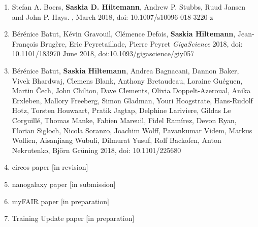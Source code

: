 \begin{enumerate}
\item Stefan A. Boers, \textbf{Saskia D. Hiltemann}, Andrew P. Stubbs, Ruud Jansen and John P. Hays. {\color{chaptergrey}{Development and evaluation of a culture-free microbiota profiling platform (MYcrobiota) for clinical diagnostics}}, March 2018, doi: 10.1007/s10096-018-3220-z

\item Bérénice Batut, Kévin Gravouil, Clémence Defois, \textbf{Saskia Hiltemann}, Jean-François Brugère, Eric Peyretaillade, Pierre Peyret {\color{chaptergrey}{ASaiM: a Galaxy-based framework to analyze raw shotgun data from microbiota.}} \textit{GigaScience} 2018, doi: 10.1101/183970
June 2018, doi:10.1093/gigascience/giy057


\item Bérénice Batut, \textbf{Saskia Hiltemann}, Andrea Bagnacani, Dannon Baker, Vivek Bhardwaj, Clemens Blank, Anthony Bretaudeau, Loraine Guéguen, Martin Čech, John Chilton, Dave Clements, Olivia Doppelt-Azeroual, Anika Erxleben, Mallory Freeberg, Simon Gladman, Youri Hoogstrate, Hans-Rudolf Hotz, Torsten Houwaart, Pratik Jagtap, Delphine Lariviere, Gildas Le Corguillé, Thomas Manke, Fabien Mareuil, Fidel Ramírez, Devon Ryan, Florian Sigloch, Nicola Soranzo, Joachim Wolff, Pavankumar Videm, Markus Wolfien, Aisanjiang Wubuli, Dilmurat Yusuf, Rolf Backofen, Anton Nekrutenko, Björn Grüning {\color{chaptergrey}{Community-driven data analysis training for biology.}} 2018, doi: 10.1101/225680

\item circos paper [in revision]
\item nanogalaxy paper [in submission]
\item myFAIR paper [in preparation]
\item Training Update paper [in preparation]

\end{enumerate}
